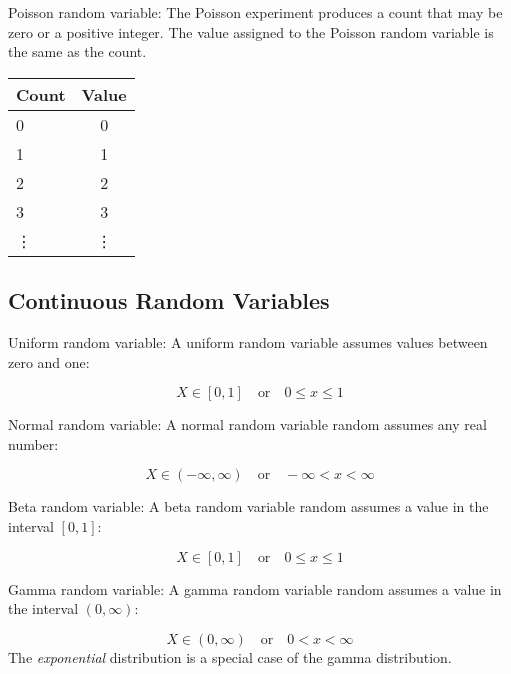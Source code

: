 \par\vspace{0.5 cm}
\begin{example*}
Poisson random variable:  The Poisson experiment produces a count that may be zero or a positive integer.  The value assigned to the Poisson random variable is the same as the count.
\par\vspace{0.5 cm}
\begin{tabular}{lc}
Count & Value\\
\hline
0 & 0\\
1 & 1\\
2 & 2\\
3 & 3\\
\vdots & \vdots
\end{tabular}
\end{example*}
\subsection{Continuous Random Variables}
\par\vspace{0.5 cm}
\begin{example*}
Uniform random variable:  A uniform random variable assumes values between zero and one:
\par\vspace{0.5 cm}
\[
X\in[0,1]\quad\mbox{or}\quad 0\leq x \leq 1
\]
\end{example*}
\par\vspace{0.5 cm}
\begin{example*}
Normal random variable:  A normal random variable random assumes any real number:
\par\vspace{0.5 cm}
\[
X\in(-\infty,\infty)\quad\mbox{or}\quad -\infty < x < \infty
\]
\end{example*}
\par\vspace{0.5 cm}
\begin{example*}
Beta random variable:  A beta random variable random assumes a value in the interval $[0,1]$:
\par\vspace{0.5 cm}
\[
X\in[0,1]\quad\mbox{or}\quad 0 \leq x \leq 1
\]
\end{example*}
\par\vspace{0.5 cm}
\begin{example*}
Gamma random variable:  A gamma random variable random assumes a value in the interval $(0,\infty)$:
\par\vspace{0.5 cm}
\[
X\in(0,\infty)\quad\mbox{or}\quad 0 < x < \infty
\]
The \textit{exponential} distribution is a special case of the gamma distribution.
\end{example*}
